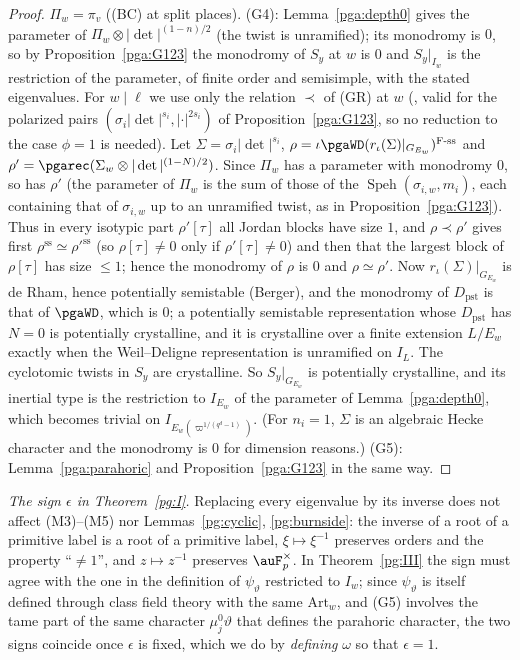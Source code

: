 \documentclass[10pt]{amsart}
\theoremstyle{definition}
\theoremstyle{remark}
\begin{document}
\begin{proof}
$\Pi_w=\pi_v$ ((BC) at split places). (G4): Lemma~\ref{pga:depth0} gives the parameter of
$\Pi_w\otimes|\det|^{(1-n)/2}$ (the twist is unramified); its monodromy is $0$, so by
Proposition~\ref{pga:G123} the monodromy of $S_y$ at $w$ is $0$ and $S_y|_{I_w}$ is the
restriction of the parameter, of finite order and semisimple, with the stated eigenvalues. For
$w\mid\ell$ we use only the relation $\prec$ of (GR) at $w$ (\cite[Theorem~A]{BLGGTlp2}, valid for
the polarized pairs $(\sigma_i|\det|^{s_i},|\cdot|^{2s_i})$ of Proposition~\ref{pga:G123}, so no
reduction to the case $\phi=1$ is needed). Let $\Sigma=\sigma_i|\det|^{s_i}$, $\rho=\iota\pgaWD
(r_\iota(\Sigma)|_{G_{E_w}})^{\mathrm{F\text{-}ss}}$ and $\rho'=\pgarec(\Sigma_w\otimes|\det|^{(1-
N)/2})$. Since $\Pi_w$ has a parameter with monodromy $0$, so has $\rho'$ (the parameter of $\Pi_w$
is the sum of those of the $\operatorname{Speh}(\sigma_{i,w},m_i)$, each containing that of
$\sigma_{i,w}$ up to an unramified twist, as in Proposition~\ref{pga:G123}). Thus in every
isotypic part $\rho'[\tau]$ all Jordan blocks have size $1$, and $\rho\prec\rho'$ gives first
$\rho^{\mathrm{ss}}\simeq\rho'^{\mathrm{ss}}$ (so $\rho[\tau]\ne0$ only if $\rho'[\tau]\ne0$) and then
that the largest block of $\rho[\tau]$ has size $\le1$; hence the monodromy of $\rho$ is $0$ and
$\rho\simeq\rho'$. Now $r_\iota(\Sigma)|_{G_{E_w}}$ is de Rham, hence potentially semistable
(Berger), and the monodromy of $D_{\mathrm{pst}}$ is that of $\pgaWD$, which is $0$; a potentially
semistable representation whose $D_{\mathrm{pst}}$ has $N=0$ is potentially crystalline, and it is
crystalline over a finite extension $L/E_w$ exactly when the Weil--Deligne representation is
unramified on $I_L$. The cyclotomic twists in $S_y$ are crystalline. So $S_y|_{G_{E_w}}$ is
potentially crystalline, and its inertial type is the restriction to $I_{E_w}$ of the parameter of
Lemma~\ref{pga:depth0}, which becomes trivial on $I_{E_w(\varpi^{1/(q^{d}-1)})}$. (For $n_i=1$,
$\Sigma$ is an algebraic Hecke character and the monodromy is $0$ for dimension reasons.) (G5):
Lemma~\ref{pga:parahoric} and Proposition~\ref{pga:G123} in the same way.
\end{proof}

\emph{The sign $\epsilon$ in Theorem~\ref{pg:I}.} Replacing every eigenvalue by its inverse does
not affect (M3)--(M5) nor Lemmas~\ref{pg:cyclic}, \ref{pg:burnside}: the inverse of a root of a
primitive label is a root of a primitive label, $\xi\mapsto\xi^{-1}$ preserves orders and the
property ``$\ne1$'', and $z\mapsto z^{-1}$ preserves $\auF_p^\times$. In Theorem~\ref{pg:III} the
sign must agree with the one in the definition of $\psi_\vartheta$ restricted to $I_w$; since
$\psi_\vartheta$ is itself defined through class field theory with the same $\mathrm{Art}_w$, and
(G5) involves the tame part of the same character $\mu_j^0\vartheta$ that defines the parahoric
character, the two signs coincide once $\epsilon$ is fixed, which we do by \emph{defining}
$\omega$ so that $\epsilon=1$.
\end{document}
